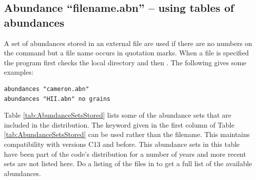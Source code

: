 \subsection{Abundance ``filename.abn'' -- using tables of abundances}

A set of abundances stored in an external file are used if there are no numbers on the
 command but a file name 
occurs in quotation marks. 
When a file is specified the program first checks the local directory and 
then . 
The following gives some examples:
\begin{verbatim}
abundances "cameron.abn"
abundances "HII.abn" no grains
\end{verbatim}


Table \ref{tab:AbundanceSetsStored} lists some of the abundance sets
that are included in the distribution.
The keyword given in the first column of Table \ref{tab:AbundanceSetsStored}
can be used rather than the filename.  
This maintains compatibility with versions C13 and before.
This abundance sets in this table have been part of the code's distribution for a number of years
and more recent sets are not listed here.
Do a listing of the  files in  
to get a full list of the available abundances.

